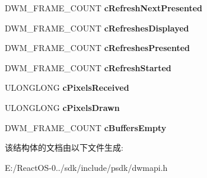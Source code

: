 \begin{DoxyCompactItemize}
D\+W\+M\+\_\+\+F\+R\+A\+M\+E\+\_\+\+C\+O\+U\+NT {\bfseries c\+Refresh\+Next\+Presented}
\item 
\mbox{\label{struct___d_w_m___t_i_m_i_n_g___i_n_f_o_a695a943bd5ffdef594e8fcc89487751b}} 
D\+W\+M\+\_\+\+F\+R\+A\+M\+E\+\_\+\+C\+O\+U\+NT {\bfseries c\+Refreshes\+Displayed}
\item 
\mbox{\label{struct___d_w_m___t_i_m_i_n_g___i_n_f_o_a4648dec3cb384c75f461be668ab2bd71}} 
D\+W\+M\+\_\+\+F\+R\+A\+M\+E\+\_\+\+C\+O\+U\+NT {\bfseries c\+Refreshes\+Presented}
\item 
\mbox{\label{struct___d_w_m___t_i_m_i_n_g___i_n_f_o_a4b49d41963244fdc7186c36de7a789ac}} 
D\+W\+M\+\_\+\+F\+R\+A\+M\+E\+\_\+\+C\+O\+U\+NT {\bfseries c\+Refresh\+Started}
\item 
\mbox{\label{struct___d_w_m___t_i_m_i_n_g___i_n_f_o_a4aae3aef40c2c1c840cef447913ab066}} 
U\+L\+O\+N\+G\+L\+O\+NG {\bfseries c\+Pixels\+Received}
\item 
\mbox{\label{struct___d_w_m___t_i_m_i_n_g___i_n_f_o_a5f274865141bb1d3ba77428e3525e6f5}} 
U\+L\+O\+N\+G\+L\+O\+NG {\bfseries c\+Pixels\+Drawn}
\item 
\mbox{\label{struct___d_w_m___t_i_m_i_n_g___i_n_f_o_a8a53219e690eaa7621b400a6991d6361}} 
D\+W\+M\+\_\+\+F\+R\+A\+M\+E\+\_\+\+C\+O\+U\+NT {\bfseries c\+Buffers\+Empty}
\end{DoxyCompactItemize}


该结构体的文档由以下文件生成\+:\begin{DoxyCompactItemize}
\item 
E\+:/\+React\+O\+S-\/0../sdk/include/psdk/dwmapi.\+h\end{DoxyCompactItemize}
